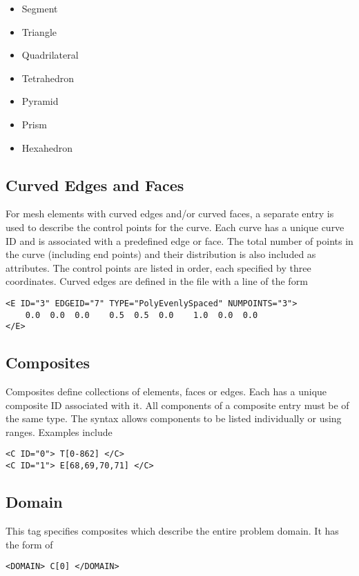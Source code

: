 \begin{itemize}
    \item {} Segment
    \item {} Triangle
    \item {} Quadrilateral
    \item {} Tetrahedron
    \item {} Pyramid
    \item {} Prism
    \item {} Hexahedron
\end{itemize}


\subsection{Curved Edges and Faces}

For mesh elements with curved edges and/or curved faces, a separate entry is used to describe the control points for the curve. Each curve has a unique curve ID and is associated with a predefined edge or face. The total number of points in the curve (including end points) and their distribution is also included as attributes. The control points are listed in order, each specified by three coordinates. Curved edges are defined in the file with a line of the form
\begin{lstlisting}[style=XMLStyle]
<E ID="3" EDGEID="7" TYPE="PolyEvenlySpaced" NUMPOINTS="3">
    0.0  0.0  0.0    0.5  0.5  0.0    1.0  0.0  0.0
</E>
\end{lstlisting}

\subsection{Composites}

Composites define collections of elements, faces or edges. Each has a unique composite ID associated with it. All components of a composite entry must be of the same type. The syntax allows components to be listed individually or using ranges. Examples include
\begin{lstlisting}[style=XMLStyle]
<C ID="0"> T[0-862] </C>
<C ID="1"> E[68,69,70,71] </C>
\end{lstlisting}

\subsection{Domain}

This tag specifies composites which describe the entire problem domain. It has the form of
\begin{lstlisting}[style=XMLStyle]
<DOMAIN> C[0] </DOMAIN>
\end{lstlisting}
